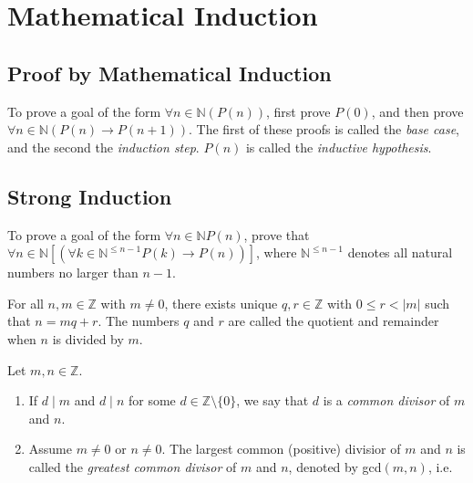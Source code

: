 \documentclass[nobib,notoc]{tufte-handout}
\begin{document}
\section{Mathematical Induction}
\subsection{Proof by Mathematical Induction}
To prove a goal of the form \(\forall n\in\mathbb{N}(P(n))\), first prove \(P(0)\), and then prove \(\forall n\in\mathbb{N}(P(n)\rightarrow P(n+1))\). The first of these proofs is called the \emph{base case}, and the second the \emph{induction step}. \(P(n)\) is called the \emph{inductive hypothesis}.
\subsection{Strong Induction}
To prove a goal of the form \(\forall n\in\mathbb{N}P(n)\), prove that \(\forall n\in\mathbb{N}[(\forall k\in\mathbb{N}^{\leq n-1}P(k)\rightarrow P(n))]\), where \(\mathbb{N}^{\leq n-1}\) denotes all natural numbers no larger than \(n-1\).
\begin{thm}
	For all \(n,m\in\mathbb{Z}\) with \(m\neq 0\), there exists unique \(q,r\in\mathbb{Z}\) with \(0\leq r<\rvert m\lvert\) such that \(n=mq+r\). The numbers \(q\) and \(r\) are called the quotient and remainder when \(n\) is divided by \(m\).
\end{thm}
\begin{defi}
	Let \(m,n\in\mathbb{Z}\).
	\begin{enumerate}
		\item If \(d\mid m\) and \(d\mid n\) for some \(d\in\mathbb{Z}\setminus\{0\}\), we say that \(d\) is a \emph{common divisor} of \(m\) and \(n\).
		\item Assume \(m\neq 0\) or \(n\neq 0\). The largest common (positive) divisior of \(m\) and \(n\) is called the \emph{greatest common divisor} of \(m\) and \(n\), denoted by gcd\((m,n)\), i.e.
			\begin{equation*}
			\end{equation*}
	\end{enumerate}
\end{defi}
\end{document}
